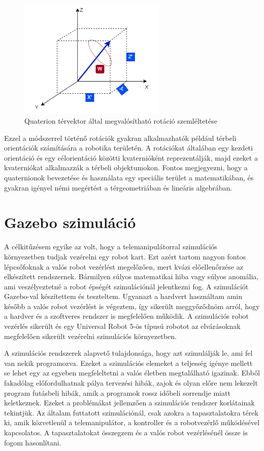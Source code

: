 \begin{figure}[!ht]
\centering
\includegraphics[width=70mm, keepaspectratio]{figures/Diagrammok/Quaterion}
\caption{Quaterion térvektor által megvalósítható rotáció szemléltetése}
\label{fig:Quaterion}
\end{figure}

Ezzel a módszerrel történő rotációk gyakran alkalmazhatók például térbeli orientációk számítására a robotika területén. A rotációkat általában egy kezdeti orientáció és egy célorientáció közötti kvaternióként reprezentálják, majd ezeket a kvaterniókat alkalmazzák a térbeli objektumokon. Fontos megjegyezni, hogy a quaternionok bevezetése és használata egy speciális terület a matematikában, és gyakran igényel némi megértést a térgeometriában és lineáris algebrában.

\section{Gazebo szimuláció}

A célkitűzésem egyike az volt, hogy a telemanipulátorral szimulációs környezetben tudjak vezérelni egy robot kart. Ezt azért tartom nagyon fontos lépcsőfoknak a valós robot vezérlést megelőzően, mert kvázi előellenőrzése az elkészített rendszernek. Bármilyen súlyos matematikai hiba vagy súlyos anomália, ami veszélyeztetné a robot épségét szimulációnál jelentkezni fog. A szimulációt Gazebo-val készítettem és teszteltem. Ugyanazt a hardvert használtam amin később a valós robot vezérlést is végeztem, így sikerült meggyőződnöm arról, hogy a hardver és a szoftveres rendszer is megfelelően működik. A szimulációs robot vezérlés sikerült és egy Universal Robot 5-ös típusú robotot az elvárásoknak megfelelően sikerült vezérelni szimulációs környezetben.

A szimulációs rendszerek alapvető tulajdonsága, hogy azt szimulálják le, ami fel van nekik programozva. Ezeket a szimulációs elemeket a teljesség igénye mellett se lehet egy az egyeben megfeleltetni a valós életben megtalálható igazinak. Ebből fakadólag előfordulhatnak pálya tervezési hibák, zajok és olyan előre nem lekezelt program futásbeli hibák, amik a programok rossz időbeli sorrendje miatt keletkeznek. Ezeket a problémákat jellemzően a szimulációs rendszer korlátainak tekintjük. Az általam futtatott szimulációnál, csak azokra a tapasztalatokra térek ki, amik közvetlenül a telemanipulátor, a kontroller és a robotvezérlő működésével kapcsolatos. A tapasztalatokat összegzem és a valós robot vezérlésénél össze is fogom hasonlítani.

